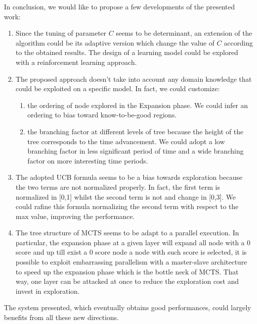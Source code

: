 \documentclass[11pt]{article}
\begin{document}
In conclusion, we would like to propose a few developments of the presented work:
\begin{enumerate}
    \item Since the tuning of parameter $C$ seems to be determinant, an extension of the algorithm could be its adaptive version which change the value of $C$ according to the obtained results. The design of a learning model could be explored with a reinforcement learning approach. 
    \item The proposed approach doesn't take into account any domain knowledge that could be exploited on a specific model. In fact, we could customize:
        \begin{enumerate}
            \item the ordering of node explored in the Expansion phase. We could infer an ordering to bias toward know-to-be-good regions.
            \item the branching factor at different levels of tree because the height of the tree corresponds to the time advancement. We could adopt a low branching factor in less significant period of time and a wide branching factor on more interesting time periods.
        \end{enumerate}
    \item The adopted UCB formula seems to be a bias towards exploration because the two terms are not normalized properly. In fact, the first term is normalized in [0,1] whilst the second term is not and change in [0,3]. We could rafine this formula normalizing the second term with respect to the max value, improving the performance.
    \item The tree structure of MCTS seems to be adapt to a parallel execution. In particular, the expansion phase at a given layer will expand all node with a 0 score and up till exist a 0 score node a node with such score is selected, it is possible to exploit embarrassing parallelism with a master-slave architecture to speed up the expansion phase which is the bottle neck of MCTS. That way, one layer can be attacked at once to reduce the exploration cost and invest in exploration. 
\end{enumerate}

The system presented, which eventually obtains good performances, could largely benefits from all these new directions.




\end{document}
